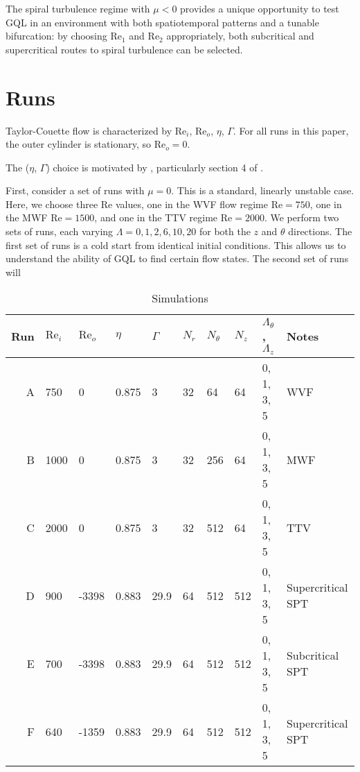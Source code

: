 \documentclass[openacc]{rstransa}%
\newcommand{\Reyn}{\mathrm{Re}}
\begin{document}
The spiral turbulence regime with $\mu < 0$ provides a unique opportunity to test GQL in an environment with both spatiotemporal patterns and a tunable bifurcation: by choosing $\Reyn_1$ and $\Reyn_2$ appropriately, both subcritical and supercritical routes to spiral turbulence can be selected. 

\section{Runs}
\label{sec:nonlinear}
Taylor-Couette flow is characterized by $\Reyn_i$, $\Reyn_o$, $\eta$, $\Gamma$. For all runs in this paper, the outer cylinder is stationary, so $\Reyn_o = 0$.

The ($\eta$, $\Gamma$) choice is motivated by \cite{1984JFM...146...45M,1984JFM...146...65M}, particularly section 4 of \cite{1984JFM...146...65M}.

First, consider a set of runs with $\mu = 0$. This is a standard, linearly unstable case. Here, we choose three $\Reyn$ values, one in the WVF flow regime $\Reyn =750$, one in the MWF $\Reyn = 1500$, and one in the TTV regime $\Reyn = 2000$. We perform two sets of runs, each varying $\Lambda = {0, 1, 2, 6, 10, 20}$ for both the $z$ and $\theta$ directions. The first set of runs is a cold start from identical initial conditions. This allows us to understand the ability of GQL to find certain flow states. The second set of runs will 


\begin{table}[!h]
\caption{Simulations}
\label{tab:simulations}
\begin{tabular}{rlllllllll}
\hline
Run & $\Reyn_i$ & $\Reyn_o$ & $\eta$ & $\Gamma$  & $N_r$ & $N_\theta$ & $N_z$& $\Lambda_\theta$, $\Lambda_z$ & Notes\\
\hline
A & 750  & 0 & 0.875  & 3 & 32 & 64 & 64 & 0, 1, 3, 5 & WVF\\
B & 1000 & 0 & 0.875 & 3 & 32 & 256 & 64 & 0, 1, 3, 5 & MWF\\
C & 2000 & 0 & 0.875 & 3 & 32 & 512 & 64 & 0, 1, 3, 5 & TTV\\
\hline
D & 900 & -3398 & 0.883 & 29.9 & 64 & 512 & 512 & 0, 1, 3, 5 & Supercritical SPT\\
E & 700 & -3398 & 0.883 & 29.9 & 64 & 512 & 512 & 0, 1, 3, 5 & Subcritical SPT\\
\hline
F & 640 & -1359 & 0.883 & 29.9 & 64 & 512 & 512 & 0, 1, 3, 5 & Supercritical SPT\\
\end{tabular}
\vspace*{-4pt}
\end{table}%
\end{document}
